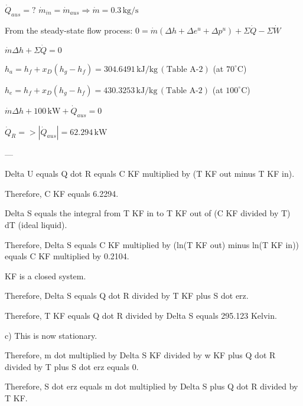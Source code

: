 \( \dot{Q}_{aus} = ? \)  
\( \dot{m}_{in} = \dot{m}_{aus} \Rightarrow \dot{m} = 0.3 \, \text{kg/s} \)  

From the steady-state flow process:  
\( 0 = \dot{m} (\Delta h + \Delta e^u + \Delta p^u) + \Sigma \dot{Q} - \Sigma \dot{W} \)  

\( \dot{m} \Delta h + \Sigma \dot{Q} = 0 \)  

\( h_a = h_f + x_D (h_g - h_f) = 304.6491 \, \text{kJ/kg} \, (\text{Table A-2}) \)  
(at \( 70^\circ \text{C} \))  

\( h_e = h_f + x_D (h_g - h_f) = 430.3253 \, \text{kJ/kg} \, (\text{Table A-2}) \)  
(at \( 100^\circ \text{C} \))  

\( \dot{m} \Delta h + 100 \, \text{kW} + \dot{Q}_{aus} = 0 \)  

\( \dot{Q}_R = > |\dot{Q}_{aus}| = 62.294 \, \text{kW} \)  

---

Delta U equals Q dot R equals C KF multiplied by (T KF out minus T KF in).  

Therefore, C KF equals 6.2294.  

Delta S equals the integral from T KF in to T KF out of (C KF divided by T) dT (ideal liquid).  

Therefore, Delta S equals C KF multiplied by (ln(T KF out) minus ln(T KF in)) equals C KF multiplied by 0.2104.  

KF is a closed system.  

Therefore, Delta S equals Q dot R divided by T KF plus S dot erz.  

Therefore, T KF equals Q dot R divided by Delta S equals 295.123 Kelvin.  

c) This is now stationary.  

Therefore, m dot multiplied by Delta S KF divided by w KF plus Q dot R divided by T plus S dot erz equals 0.  

Therefore, S dot erz equals m dot multiplied by Delta S plus Q dot R divided by T KF.